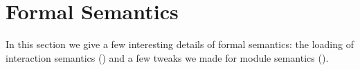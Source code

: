 \section{Formal Semantics}
\label{sec:main-semantics}









In this section we give a few interesting details of formal semantics: the loading of interaction
semantics () and a few tweaks we made for module semantics
().


